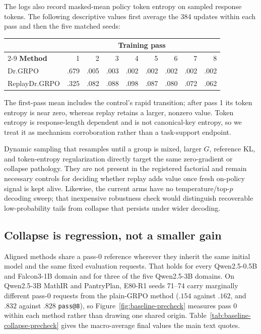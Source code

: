 \documentclass{article}
\newcommand{\1}{\mathbf 1}
\theoremstyle{remark}
\theoremstyle{definition}
\theoremstyle{plain}
\begin{document}
The logs also record masked-mean policy token entropy on sampled response tokens.
The following descriptive values first average the 384 updates within each pass
and then the five matched seeds:
\begin{center}
\scriptsize
\begin{tabular}{@{}lrrrrrrrr@{}}
\toprule
& \multicolumn{8}{c}{\textbf{Training pass}} \\
\cmidrule(l){2-9}
\textbf{Method} & 1 & 2 & 3 & 4 & 5 & 6 & 7 & 8 \\
\midrule
Dr.GRPO & .679 & .005 & .003 & .002 & .002 & .002 & .002 & .002 \\
ReplayDr.GRPO & .325 & .082 & .088 & .098 & .087 & .080 & .072 & .062 \\
\bottomrule
\end{tabular}
\end{center}
The first-pass mean includes the control's rapid transition; after pass 1 its
token entropy is near zero, whereas replay retains a larger, nonzero value.
Token entropy is response-length dependent and is not canonical-key entropy, so
we treat it as mechanism corroboration rather than a task-support endpoint.

Dynamic sampling that resamples until a group is mixed, larger \(G\), reference
KL, and token-entropy regularization directly target the same zero-gradient or
collapse pathology. They are not present in the registered factorial and remain
necessary controls for deciding whether replay adds value once fresh on-policy
signal is kept alive. Likewise, the current arms have no temperature/top-$p$
decoding sweep; that inexpensive robustness check would distinguish recoverable
low-probability tails from collapse that persists under wider decoding.

\subsection{Collapse is regression, not a smaller gain}
\label{app:pre-rl-regression}

Aligned methods share a pass-0 reference wherever they inherit the same initial
model and the same fixed evaluation requests. That holds for every
Qwen2.5-0.5B and Falcon3-1B domain and for three of the five Qwen2.5-3B domains.
On Qwen2.5-3B MathIR and PantryPlan, E80-R1 seeds 71--74 carry marginally
different pass-0 requests from the plain-GRPO method ($.154$ against $.162$, and
$.832$ against $.828$ \texttt{pass@8}), so
Figure~\ref{fig:baseline-precheck} measures pass 0 within each method rather than
drawing one shared origin. Table~\ref{tab:baseline-collapse-precheck} gives the
macro-average final values the main text quotes.
\end{document}
